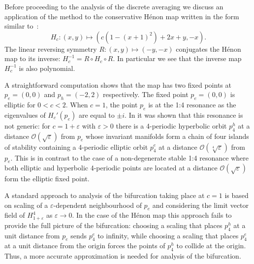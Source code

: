 \documentclass[a4paper,12pt]{article}
\begin{document}
Before proceeding to the analysis of the discrete averaging
we discuss an application of the method to 
 the conservative Hénon map written  in the form similar to~\cite{SimVie09}:
\begin{equation} \label{henon}
H_c:(x,y)\mapsto  (c(1-(x+1)^2)+2x+y,-x).
\end{equation}
The linear reversing symmetry $R:(x,y)\mapsto (-y,-x)$
conjugates the Hénon map to its inverse:  $H_c^{-1} = R \circ H_c \circ R$. In particular we see that the inverse
map $H_c^{-1}$ is also polynomial. 

A straightforward computation shows that the map has two fixed points at $p_e=(0,0)$
and $p_h=(-2,2)$ respectively.
The fixed point $p_e=(0,0)$ is elliptic for $0<c<2$.
When $c=1$, the point $p_e$
is at the  1:4 resonance as the eigenvalues of $H_c'(p_e)$
are equal to $\pm i$.
In \cite{Bir87} it was shown that this resonance is not generic:
for $c=1+\varepsilon$ with $\varepsilon>0$ there is a 4-periodic hyperbolic orbit $p_4^h$ 
 at a distance $\mathcal{O}(\sqrt{\varepsilon})$ from $p_e$
 whose
invariant  manifolds form a chain of four islands of stability containing a
4-periodic elliptic orbit $p_4^e$ at a distance
$\mathcal{O}(\sqrt[4]{\varepsilon})$ from $p_e$. 
This is in contrast to the case of a non-degenerate stable 1:4
resonance where both elliptic and hyperbolic 4-periodic points are
located at a distance $\mathcal{O}(\sqrt{\varepsilon})$
form the elliptic fixed point.

A standard approach to analysis of the bifurcation taking place at $c=1$ is based on scaling of a $\varepsilon$-dependent neighbourhood of $p_e$ and considering the limit vector field  
of $H_{1+\varepsilon}^4$ as $\varepsilon\to0$. 
In the case of the Hénon map this approach fails to provide
the full picture of the bifurcation: 
choosing a scaling  that places $p_4^h$ at a unit distance
from $p_e$ sends $p_4^e$ to infinity, while choosing a scaling  that
places $p_4^e$
 at a unit distance from the origin forces the points of $p_4^h$ to collide at the origin. 
Thus, a more accurate approximation 
is needed  for analysis of the bifurcation.
\end{document}
